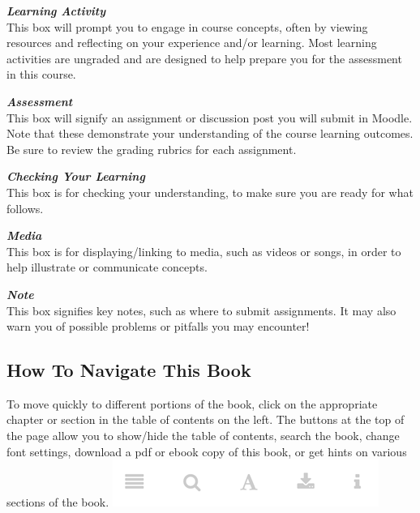 \documentclass[
]{book}
\begin{document}
\begin{reflect}
 \textbf{\emph{Learning Activity}}\\
 This box will prompt you to engage in course concepts, often by viewing
 resources and reflecting on your experience and/or learning. Most
 learning activities are ungraded and are designed to help prepare you
 for the assessment in this course.
 \end{reflect}

\begin{assessment}
 \textbf{\emph{Assessment}}\\
 This box will signify an assignment or discussion post you will submit
 in Moodle. Note that these demonstrate your understanding of the course
 learning outcomes. Be sure to review the grading rubrics for each
 assignment.
 \end{assessment}

\begin{progress}
 \textbf{\emph{Checking Your Learning}}\\
 This box is for checking your understanding, to make sure you are ready
 for what follows.
 \end{progress}

\begin{reflect}
 \textbf{\emph{Media}}\\
 This box is for displaying/linking to media, such as videos or songs, in
 order to help illustrate or communicate concepts.
 \end{reflect}

\begin{caution}
 \textbf{\emph{Note}}\\
 This box signifies key notes, such as where to submit assignments. It
 may also warn you of possible problems or pitfalls you may encounter!
 \end{caution}

\hypertarget{how-to-navigate-this-book}{%
\subsection*{How To Navigate This Book}\label{how-to-navigate-this-book}}

To move quickly to different portions of the book, click on the appropriate chapter or section in the table of contents on the left. The buttons at the top of the page allow you to show/hide the table of contents, search the book, change font settings, download a pdf or ebook copy of this book, or get hints on various sections of the book.
\includegraphics{assets/course-intro/menu.png}
\end{document}

